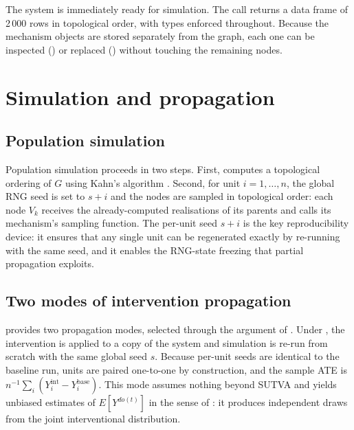 \documentclass[article]{jss}
\begin{document}
\noindent
The system is immediately ready for simulation. The call
 returns a data frame of
2\,000 rows in topological order, with types enforced throughout. Because the
mechanism objects are stored separately from the graph, each one can be inspected
() or replaced () without touching the remaining nodes.

\section{Simulation and propagation}
\label{sec:propagation}

\subsection{Population simulation}

Population simulation proceeds in two steps. First, 
computes a topological ordering of $G$ using Kahn's algorithm
\citep{kahn1962topological}. Second, for unit $i = 1, \ldots, n$, the global RNG
seed is set to $s + i$ and the nodes are sampled in topological order: each node
$V_k$ receives the already-computed realisations of its parents and calls its
mechanism's sampling function. The per-unit seed $s + i$ is the key reproducibility
device: it ensures that any single unit can be regenerated exactly by re-running
with the same seed, and it enables the RNG-state freezing that partial propagation
exploits.

\subsection{Two modes of intervention propagation}

 provides two propagation modes, selected through the
 argument of . Under , the
intervention is applied to a copy of the system and simulation is re-run from
scratch with the same global seed $s$. Because per-unit seeds are identical to the
baseline run, units are paired one-to-one by construction, and the sample ATE is
$n^{-1}\sum_i (Y_i^\mathrm{int} - Y_i^\mathrm{base})$. This mode assumes nothing
beyond SUTVA \citep{rubin1980randomization} and yields unbiased estimates of
$E[Y^{do(t)}]$ in the sense of \citet{rubin1974estimating}: it produces independent
draws from the joint interventional distribution.
\end{document}
